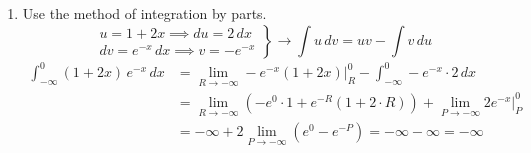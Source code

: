 \documentclass[a4paper, 12pt]{article}
\begin{document}
\begin{enumerate}[leftmargin=*,label=\textbf{\arabic*.}]
\begin{enumerate}[leftmargin=*,label=\textbf{\alph*.}]
Apply the same procedure.
\[
\left.\begin{array}{c}
w=x\implies dw=dx\\[1em]
\displaystyle dz=\sin(4x)\,dx\implies z=-\frac14\cos(4x)
\end{array}\right\}\rightarrow\int w\,dz=wz-\int z\,dw
\]
\vspace{-1em}
\begin{align*}I&=\frac{x^2}4\sin(4x)-\frac12\left[\frac{-x}4\cos(4x)-\int-\frac14\cos(4x)\,dx\right]\\[1em]&=\boxed{\frac{x^2}4\sin(4x)+\frac x8\cos(4x)-\frac1{32}\sin(4x)+C,\quad C\in\mathbb{R}}\end{align*}

\item Rewrite the integral.
\[I=\int\frac{dx}{2x^2-3x+2}=\int\frac{dx}{\displaystyle2x^2-3x+\frac98+\frac78}=\int\frac{dx}{\left(\sqrt2x-\frac{3\sqrt2}4\right)^2+\frac78}\]
\[=\frac87\int\frac{dx}{\frac{8\left(\sqrt2x-\frac{3\sqrt2}4\right)^2}7+1}\]

Let $u=\frac{2\sqrt2}{\sqrt7}\left(\sqrt2x-\frac{3\sqrt2}4\right)$, then $ du=\frac4{\sqrt7}\,dx$.
\begin{align*}I&=\frac87\int\frac{dx}{\dfrac{8\left(\sqrt2x-\frac{3\sqrt2}4\right)^2}7+1^2}=\frac87\int\frac{1}{u^2+1}\cdot\frac{\sqrt7}4\,du=\frac2{\sqrt7}\int\frac1{u^2+1}\,du\\[1em]&=\frac2{\sqrt7}\arctan u+C=\frac2{\sqrt7}\arctan\left[\frac{2\sqrt2}{\sqrt7}\left(\sqrt2x-\frac{3\sqrt2}4\right)\right]+C\\[1em]&=\boxed{\frac2{\sqrt7}\arctan\left(\frac{4x-3}{\sqrt7}\right)+C,\quad C\in\mathbb{R}}\end{align*}

\end{enumerate}

\item Use the method of integration by parts.
\[
\left.\begin{array}{c}
u=1+2x\implies du=2\,dx\\
dv= e^{-x}\,dx\implies v=- e^{-x}
\end{array}\right\}\rightarrow\int u\,dv=uv-\int v\,du
\]
\vspace{-1em}
\begin{align*}\int_{-\infty}^0(1+2x)\, e^{-x}\,dx&=\lim_{R\to-\infty}- e^{-x}(1+2x)\bigg|_R^0-\int_{-\infty}^0- e^{-x}\cdot2\,dx\\[1em]&=\lim_{R\to-\infty}\left(- e^0\cdot1+\mathrm{}e^{-R}(1+2\cdot R)\right)+\lim_{P\to-\infty}2 e^{-x}\bigg|_P^0\\[1em]&=-\infty+2\lim_{P\to-\infty}\left( e^0- e^{-P}\right)=-\infty-\infty=\boxed{-\infty}\end{align*}


\end{enumerate}
\end{document}

